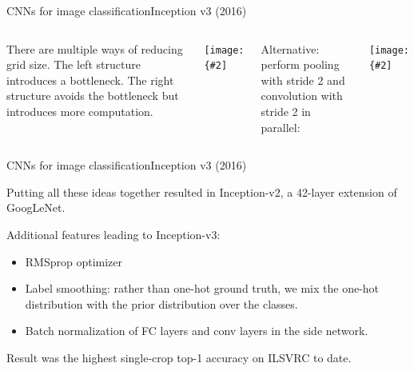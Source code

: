 \documentclass{beamer}
\newcommand{\myfig}[3]{\centerline{\texttt{[image: \{\#2]}}}
\begin{document}
\begin{frame}{CNNs for image classification}{Inception v3 (2016)}

  \begin{columns}

  \column{2in}

  There are multiple ways of reducing grid size. The left structure
  introduces a bottleneck. The right structure avoids the bottleneck
  but introduces more computation.

  \medskip

  \myfig{1.8in}{szegedy-15-fig9}{Szegedy et al. (2016), Figure 9}

  \column{2in}

  Alternative: perform pooling with stride 2 and convolution with stride
  2 in parallel:

  \medskip

  \myfig{1.8in}{szegedy-15-fig10}{Szegedy et al. (2016), Figure 10}

  \end{columns}

\end{frame}


\begin{frame}{CNNs for image classification}{Inception v3 (2016)}

  Putting all these ideas together resulted in Inception-v2, a 42-layer
  extension of GoogLeNet.

  \medskip

  Additional features leading to Inception-v3:
  \begin{itemize}
    \item RMSprop optimizer
    \item Label smoothing: rather than one-hot ground truth, we
      mix the one-hot distribution with the prior distribution
      over the classes.
    \item Batch normalization of FC layers and conv layers in the
      side network.
  \end{itemize}

  \medskip

  Result was the highest single-crop top-1 accuracy on ILSVRC to
  date.

\end{frame}
\end{document}

